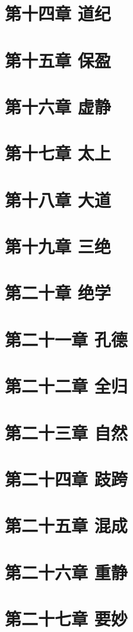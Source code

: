 \documentclass[UTF8]{ctexart}
\begin{document}
	\section{第十四章 道纪}
	\section{第十五章 保盈}
	\section{第十六章 虚静}
	\section{第十七章 太上}
	\section{第十八章 大道}
	\section{第十九章 三绝}
	\section{第二十章 绝学}
	\section{第二十一章 孔德}
	\section{第二十二章 全归}
	\section{第二十三章 自然}
	\section{第二十四章 跂跨}
	\section{第二十五章 混成}
	\section{第二十六章 重静}
	\section{第二十七章 要妙}
\end{document}
